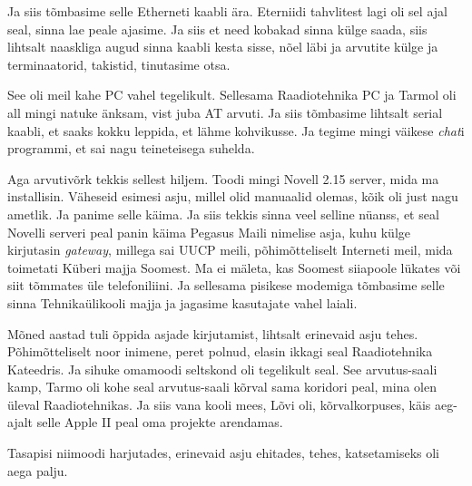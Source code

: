 Ja siis tõmbasime selle Etherneti kaabli ära. Eterniidi tahvlitest lagi oli sel 
ajal seal, sinna lae peale ajasime. Ja siis et need  kobakad sinna külge saada, 
siis lihtsalt naaskliga augud sinna kaabli  kesta sisse, nõel läbi ja 
arvutite külge ja terminaatorid, takistid, tinutasime otsa. 


See oli meil kahe PC vahel tegelikult. Sellesama Raadiotehnika PC ja Tarmol oli 
all mingi natuke änksam, vist juba AT arvuti. Ja siis tõmbasime lihtsalt serial 
kaabli, et saaks kokku leppida, et lähme kohvikusse. Ja tegime mingi väikese 
\emph{chat}i programmi, et sai nagu teineteisega suhelda. 

Aga arvutivõrk tekkis sellest hiljem. Toodi mingi Novell 2.15 
server, mida ma installisin. Väheseid esimesi asju, millel olid manuaalid 
olemas, kõik oli just nagu ametlik. Ja panime selle käima. Ja siis tekkis sinna 
veel selline nüanss, et seal Novelli serveri peal panin käima Pegasus 
Maili nimelise asja, kuhu külge kirjutasin \emph{gateway}, 
millega sai UUCP meili, põhimõtteliselt Interneti meil, mida toimetati Küberi 
majja Soomest. Ma ei mäleta, kas Soomest siiapoole lükates või siit tõmmates 
üle telefoniliini. Ja sellesama pisikese modemiga tõmbasime selle sinna 
Tehnikaülikooli majja ja jagasime kasutajate vahel laiali.


Mõned aastad tuli õppida asjade kirjutamist, lihtsalt erinevaid asju tehes. 
Põhimõtteliselt noor inimene, peret polnud, elasin ikkagi seal Raadiotehnika 
Kateedris. Ja sihuke omamoodi seltskond oli tegelikult seal. See arvutus-saali 
kamp, Tarmo oli kohe seal arvutus-saali kõrval sama 
koridori peal, mina olen üleval Raadiotehnikas. Ja siis vana kooli mees, 
Lõvi oli, kõrvalkorpuses, käis aeg-ajalt selle Apple II peal 
oma  projekte arendamas.

Tasapisi niimoodi harjutades, erinevaid asju ehitades, tehes,  katsetamiseks 
oli aega palju.


